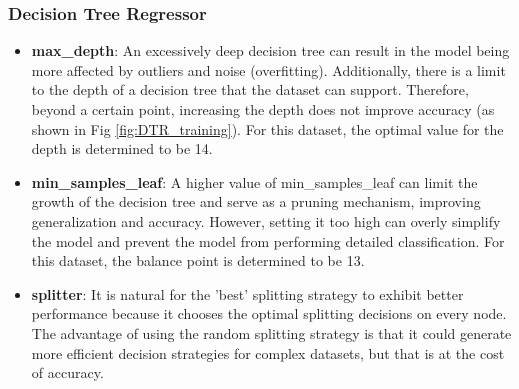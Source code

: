 \documentclass[a4paper]{article}
\begin{document}
\subsubsection{Decision Tree Regressor}

\begin{itemize}
    \item \textbf{max\_depth}: An excessively deep decision tree can result in the model being more affected by outliers and noise (overfitting). Additionally, there is a limit to the depth of a decision tree that the dataset can support. Therefore, beyond a certain point, increasing the depth does not improve accuracy (as shown in Fig \ref{fig:DTR_training}). For this dataset, the optimal value for the depth is determined to be 14.
    \item \textbf{min\_samples\_leaf}: A higher value of min\_samples\_leaf can limit the growth of the decision tree and serve as a pruning mechanism, improving generalization and accuracy. However, setting it too high can overly simplify the model and prevent the model from performing detailed classification. For this dataset, the balance point is determined to be 13.
    \item \textbf{splitter}: It is natural for the 'best' splitting strategy to exhibit better performance because it chooses the optimal splitting decisions on every node. The advantage of using the random splitting strategy is that it could generate more efficient decision strategies for complex datasets, but that is at the cost of accuracy.
\end{itemize}
\end{document}
